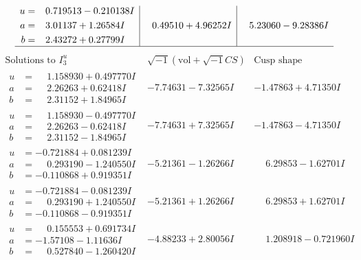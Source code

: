 \documentclass[1p]{elsarticle_modified}
\theoremstyle{definition}
\newcommand{\I}{\sqrt{-1}}
\begin{document}
$$\begin{array}{c|c|c}
\begin{aligned}
u &= \phantom{-}0.719513 - 0.210138 I \\
a &= \phantom{-}3.01137 + 1.26584 I \\
b &= \phantom{-}2.43272 + 0.27799 I\end{aligned}
 & \phantom{-}0.49510 + 4.96252 I & \phantom{-}5.23060 - 9.28386 I\\
 \hline 
 \end{array}$$\newpage$$\begin{array}{c|c|c}  
\text{Solutions to }I^u_{3}& \I (\text{vol} + \sqrt{-1}CS) & \text{Cusp shape}\\
 \hline 
\begin{aligned}
u &= \phantom{-}1.158930 + 0.497770 I \\
a &= \phantom{-}2.26263 + 0.62418 I \\
b &= \phantom{-}2.31152 + 1.84965 I\end{aligned}
 & -7.74631 - 7.32565 I & -1.47863 + 4.71350 I \\ \hline\begin{aligned}
u &= \phantom{-}1.158930 - 0.497770 I \\
a &= \phantom{-}2.26263 - 0.62418 I \\
b &= \phantom{-}2.31152 - 1.84965 I\end{aligned}
 & -7.74631 + 7.32565 I & -1.47863 - 4.71350 I \\ \hline\begin{aligned}
u &= -0.721884 + 0.081239 I \\
a &= \phantom{-}0.293190 - 1.240550 I \\
b &= -0.110868 + 0.919351 I\end{aligned}
 & -5.21361 - 1.26266 I & \phantom{-}6.29853 - 1.62701 I \\ \hline\begin{aligned}
u &= -0.721884 - 0.081239 I \\
a &= \phantom{-}0.293190 + 1.240550 I \\
b &= -0.110868 - 0.919351 I\end{aligned}
 & -5.21361 + 1.26266 I & \phantom{-}6.29853 + 1.62701 I \\ \hline\begin{aligned}
u &= \phantom{-}0.155553 + 0.691734 I \\
a &= -1.57108 - 1.11636 I \\
b &= \phantom{-}0.527840 - 1.260420 I\end{aligned}
 & -4.88233 + 2.80056 I & \phantom{-}1.208918 - 0.721960 I \\ \hline\begin{aligned}

\end{aligned}
\end{array}$$
\end{document}
